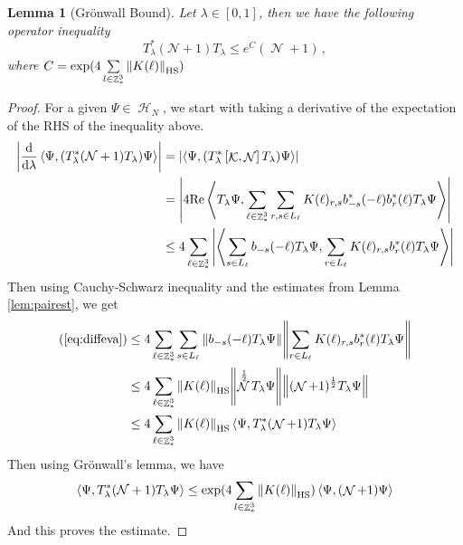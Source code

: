 \documentclass[sn-mathphys, Numbered ,a4paper]{sn-jnl}%
\DeclareMathOperator{\Z}{\mathbb{Z}}
\DeclareMathOperator{\HH}{\mathcal{H}}
\DeclareMathOperator{\KK}{\mathcal{K}}
\DeclareMathOperator{\NN}{\mathcal{N}}
\newcommand{\half}{\frac{1}{2}}
\newcommand{\eva}[1]{\left\langle #1 \right\rangle}
\newcommand{\di}{\mathrm{d}}
\theoremstyle{plain}
\newtheorem{lemma}[theorem]{Lemma}
\theoremstyle{definition}
\theoremstyle{remark}
\theoremstyle{plain}
\theoremstyle{definition}
\theoremstyle{remark}
\begin{document}
\begin{lemma}[Gr\"onwall Bound]\label{lem:gronNest}
    Let $\lambda\in [0,1]$, then we have the following operator inequality
    \begin{equation}
     T^*_{\lambda}(\mathcal{N} +1)T_{\lambda} \leq e^C (\NN+1)\, ,    
    \end{equation}
     where $C = \mathrm{exp}(4\sum\limits_{l\in \Z^3_*}\norm{K(\ell)}_{\mathrm{HS}})$
\end{lemma}
\begin{proof}
    For a given $\Psi \in \HH_N$, we start with taking a derivative of the expectation of the RHS of the inequality above.
    \begin{align}
        \left|\frac{\di}{\di\lambda}\eva{\Psi, (T^*_{\lambda}(\mathcal{N} +1)T_{\lambda})\Psi }\right| 
        &= \left|\eva{\Psi,(T^*_{\lambda}\left[\KK,\NN\right]T_{\lambda}) \Psi}\right|\nonumber\\
        &= \abs{4\mathrm{Re} \eva{T_\lambda\Psi,\sum\limits_{\ell \in \Z^3_*}\sum\limits_{r,s \in L_{\ell}}K(\ell)_{r,s} b^*_{-s}(-\ell)b^*_{r}(\ell)T_\lambda\Psi}}\nonumber\\
        &\leq 4 \sum\limits_{\ell \in \Z^3_*} \abs{\eva{\sum\limits_{s \in L_{\ell}}b_{-s}(-\ell) T_\lambda\Psi,\sum\limits_{r \in L_{\ell}}K(\ell)_{r,s} b^*_{r}(\ell)T_\lambda\Psi}}\label{eq:diffeva}
    \end{align}
    Then using Cauchy-Schwarz inequality and the estimates from Lemma \ref{lem:pairest}, we get
    \begin{align}
        (\ref{eq:diffeva}) &\leq 4\sum\limits_{\ell \in \Z^3_*}\sum\limits_{s \in L_{\ell}} \norm{b_{-s}(-\ell) T_\lambda\Psi} \norm{\sum\limits_{r \in L_{\ell}}K(\ell)_{r,s} b^*_{r}(\ell)T_\lambda\Psi} \nonumber\\
        &\leq 4 \sum\limits_{\ell \in \Z^3_*} \norm{K(\ell)}_{\mathrm{HS}}\norm{\NN^\half T_\lambda\Psi}\norm{(\NN+1)^\half T_\lambda\Psi}\nonumber\\
        &\leq 4 \sum\limits_{\ell \in \Z^3_*} \norm{K(\ell)}_{\mathrm{HS}} \eva{\Psi,T^*_\lambda(\NN+1)T_\lambda\Psi}
    \end{align}
    Then using Gr\"onwall's lemma, we have
    \begin{equation}
        \eva{\Psi, T^*_{\lambda}(\mathcal{N} +1)T_{\lambda} \Psi } \leq \mathrm{exp}(4\sum\limits_{l\in \Z^3_*} \norm{K(\ell)}_{\mathrm{HS}}) \eva{\Psi, (\NN+1)\Psi}
    \end{equation}
    And this proves the estimate.
\end{proof}
\end{document}
